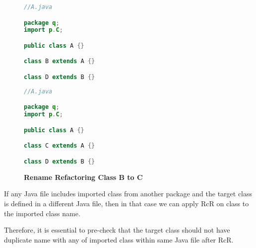\begin{figure}[th]
\centering
\begin{minipage}[t]{0.45\linewidth}
\begin{lstlisting}[language=java, basicstyle=\scriptsize\ttfamily,frame=single]	
//A.java

package q;
import p.C;

public class A {}

class B extends A {}

class D extends B {}
\end{lstlisting}
\end{minipage}
\hfill
\begin{minipage}[t]{0.45\linewidth}
\begin{lstlisting}[language=java, basicstyle=\scriptsize\ttfamily,frame=single]
//A.java

package q;
import p.C;

public class A {}

class C extends A {}

class D extends B {}	
\end{lstlisting}
\end{minipage}
\caption{\textbf{Rename Refactoring Class B to C}}
\label{figure:figpc3_1}
\end{figure}

If any Java file includes imported class from another package and the target class is defined in a different Java file, then in that case we can apply RcR on class to the imported class name.

Therefore, it is essential to pre-check that the target class should not have duplicate name with any of imported class within same Java file after RcR.

